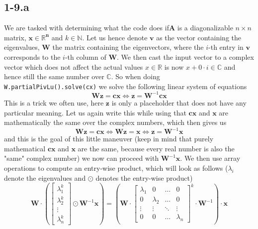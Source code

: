 \documentclass{article}
\begin{document}
\subsection*{1-9.a}
We are tasked with determining what the code does if$ \mathbf{A}$ is a diagonalizable $n \times n$ matrix, $\mathbf{x \in \mathbb{R}^{n}}$ and $k \in \mathbb{N}$. Let us hence denote $\mathbf{v}$ as the vector containing the eigenvalues, $\mathbf{W}$ the matrix containing the eigenvectors, where the $i$-th entry in $\mathbf{v}$ corresponds to the $i$-th column of $\mathbf{W}$. We then cast the input vector to a complex vector which does not affect the actual values $x \in \mathbb{R}$ is now $x + 0\cdot i \in \mathbb{C}$ and hence still the same number over $\mathbb{C}$. So when doing \verb|W.partialPivLu().solve(cx)| we solve the following linear system of equations
\begin{equation*}
    \mathbf{W}\mathbf{z} = \mathbf{cx} \Longleftrightarrow \mathbf{z} = \mathbf{W}^{-1}\mathbf{cx}
\end{equation*}
This is a trick we often use, here $\mathbf{z}$ is only a placeholder that does not have any particular meaning. Let us again write this while using that $\mathbf{cx}$ and $\mathbf{x}$  are mathematically the same over the complex numbers, which then gives us 
\begin{equation*}
    \mathbf{W}\mathbf{z} = \mathbf{cx} \Longleftrightarrow 
    \mathbf{W}\mathbf{z} = \mathbf{x} \Longleftrightarrow \mathbf{z} = \mathbf{W}^{-1}\mathbf{x}
\end{equation*}
and this is the goal of this little maneuver (keep in mind that purely mathematical $\mathbf{cx}$ and $\mathbf{x}$ are the same, because every real number is also the "same" complex number) we now can proceed with $\mathbf{W}^{-1}\mathbf{x}$. We then use array operations to compute an entry-wise product, which will look as follows ($\lambda_{i}$ denote the eigenvalues and $\odot$ denotes the entry-wise product)
\begin{equation*}
\mathbf{W}\cdot\left(
\begin{bmatrix}
   \lambda_{1}^{k} \\
   \lambda_{2}^{k} \\
   \vdots \\
   \lambda_{n}^{k}
   \end{bmatrix} \odot \mathbf{W}^{-1}\mathbf{x} \right) = \left(\mathbf{W} \cdot\begin{bmatrix}
       \lambda_{1} & 0 & \dots & 0 \\
       0 & \lambda_{2} & \dots & 0 \\
       \vdots & \vdots & \ddots & \vdots \\
       0 & 0 & \dots & \lambda_{n}
   \end{bmatrix}^{k} \cdot \mathbf{W}^{-1}\right) \cdot \mathbf{x}
\end{equation*}
\end{document}
